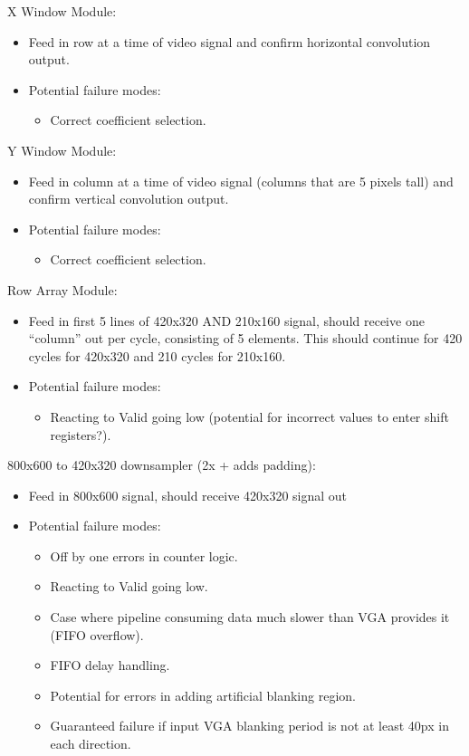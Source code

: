 \documentclass[11pt]{article}
\begin{document}
\noindent X Window Module:
\begin{itemize}
    \item Feed in row at a time of video signal and confirm horizontal convolution output.
    \item Potential failure modes:
        \begin{itemize}
            \item Correct coefficient selection.
        \end{itemize}
\end{itemize}


\noindent Y Window Module:
\begin{itemize}
    \item Feed in column at a time of video signal (columns that are 5 pixels tall) and confirm vertical convolution output.
    \item Potential failure modes:
        \begin{itemize}
            \item Correct coefficient selection.
        \end{itemize}
\end{itemize}


 Row Array Module:
\begin{itemize}
    \item Feed in first 5 lines of 420x320 AND 210x160 signal, should receive one ``column'' out per cycle, consisting of 5 elements. This should continue for 420 cycles for 420x320 and 210 cycles for 210x160.
    \item Potential failure modes:
        \begin{itemize}
            \item Reacting to Valid going low (potential for incorrect values to enter shift registers?).
        \end{itemize}
\end{itemize}


\noindent 800x600 to 420x320 downsampler (2x + adds padding):
\begin{itemize}
    \item Feed in 800x600 signal, should receive 420x320 signal out
    \item Potential failure modes:
        \begin{itemize}
            \item Off by one errors in counter logic.
            \item Reacting to Valid going low.
            \item Case where pipeline consuming data much slower than VGA provides it (FIFO overflow).
            \item FIFO delay handling.
            \item Potential for errors in adding artificial blanking region.
            \item Guaranteed failure if input VGA blanking period is not at least 40px in each direction.
        \end{itemize}
\end{itemize}
\end{document}
